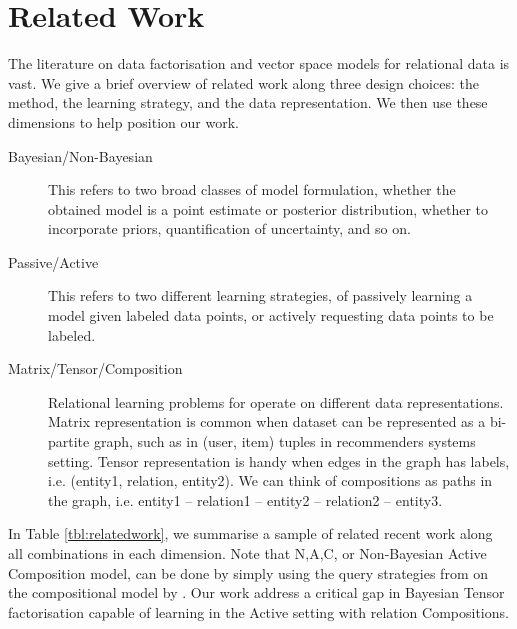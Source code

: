 
\section{Related Work}

The literature on data factorisation and vector space models for 
relational data is vast. 
We give a brief overview of related work along three design choices:
the method, the learning strategy, and the data representation. 
We then use these dimensions to help position our work. 
\begin{description}
\item[Bayesian/Non-Bayesian] This refers to two broad classes of model 
formulation, whether the obtained model is a point estimate or posterior 
distribution, whether to incorporate priors, quantification of uncertainty, 
and so on. 
\item[Passive/Active] This refers to two different learning strategies, 
of passively learning a model given labeled data points, or actively 
requesting data points to be labeled.
\item[Matrix/Tensor/Composition] Relational learning problems for operate on 
different data representations. Matrix representation is common when dataset 
can be represented as a bi-partite graph, such as in (user, item) tuples in 
recommenders systems setting. Tensor representation is handy when edges in the 
graph has labels, i.e. (entity1, relation, entity2). We can think of 
compositions as paths in the graph, i.e. entity1 -- relation1 -- entity2 -- 
relation2 -- entity3.
\end{description}
In Table \ref{tbl:relatedwork}, we summarise a sample of related recent work 
along all combinations in each dimension. 
Note that N,A,C, or Non-Bayesian Active Composition model, can be done by 
simply using the query strategies from \citet{kajino2015active} on the 
compositional model by \citet{guu2015traversing}. Our work address a critical gap 
in Bayesian Tensor factorisation capable of learning in the 
Active setting with relation Compositions.

